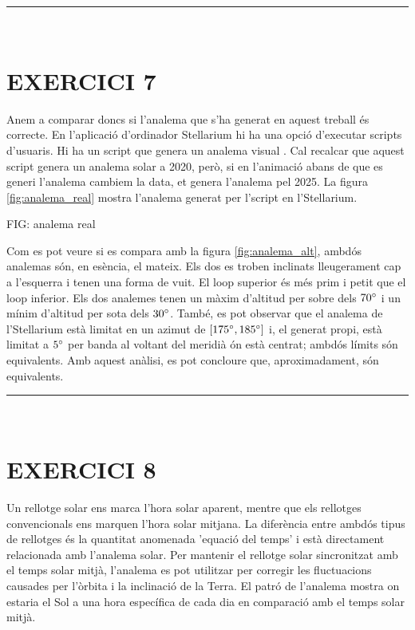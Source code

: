 \documentclass[a4paper, 11pt]{article}
\begin{document}
\vspace{10mm}
\hrule\
\vspace{5mm}


\section*{EXERCICI 7}

\noindent Anem a comparar doncs si l'analema que s'ha generat en aquest treball és correcte. En l'aplicació d'ordinador Stellarium hi ha una opció d'executar scripts d'usuaris. Hi ha un script que genera un analema visual \cite{SCRIPT_STELLARIUM}. Cal recalcar que aquest script genera un analema solar a 2020, però, si en l'animació abans de que es generi l'analema cambiem la data, et genera l'analema pel 2025. La figura \ref{fig:analema_real} mostra l'analema generat per l'script en l'Stellarium.

\vspace{2mm}
FIG: analema real
\vspace{2mm}

\noindent Com es pot veure si es compara amb la figura \ref{fig:analema_alt}, ambdós analemas són, en esència, el mateix. Els dos es troben inclinats lleugerament cap a l'esquerra i tenen una forma de vuit. El loop superior és més prim i petit que el loop inferior. Els dos analemes tenen un màxim d'altitud per sobre dels $70 \degree$ i un mínim d'altitud per sota dels $30 \degree$. També, es pot observar que el analema de l'Stellarium està limitat en un azimut de $[175\degree ,185\degree]$ i, el generat propi, està limitat a $5 \degree$ per banda al voltant del meridià ón està centrat; ambdós límits són equivalents. Amb aquest anàlisi, es pot concloure que, aproximadament, són equivalents. 

\vspace{10mm}
\hrule\
\vspace{5mm}


\section*{EXERCICI 8}
\noindent Un rellotge solar ens marca l'hora solar aparent, mentre que els rellotges convencionals ens marquen l'hora solar mitjana. La diferència entre ambdós tipus de rellotges és la quantitat anomenada 'equació del temps' i està directament relacionada amb l'analema solar. Per mantenir el rellotge solar sincronitzat amb el temps solar mitjà, l'analema es pot utilitzar per corregir les fluctuacions causades per l'òrbita i la inclinació de la Terra. El patró de l'analema mostra on estaria el Sol a una hora específica de cada dia en comparació amb el temps solar mitjà.
\end{document}
